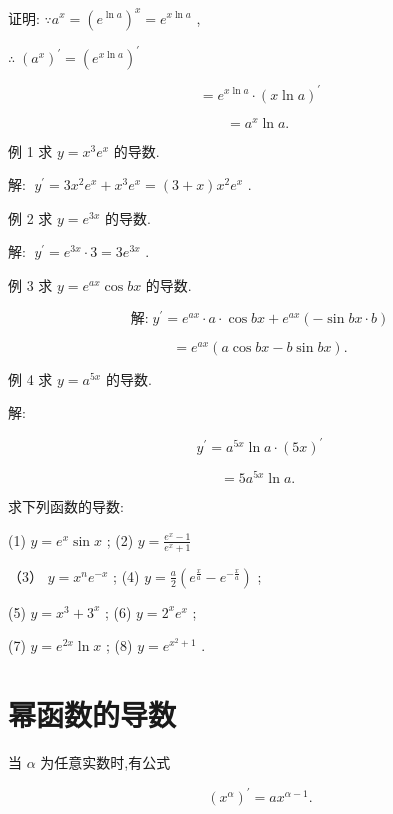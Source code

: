 \documentclass[lang=cn,newtx,10pt,scheme=chinese]{elegantbook}
\begin{document}
证明: \(\because {a}^{x} = {\left( {e}^{\ln a}\right) }^{x} = {e}^{x\ln a}\) ,

\(\therefore \;{\left( {a}^{x}\right) }^{\prime } = {\left( {e}^{x\ln a}\right) }^{\prime }\)

\[
= {e}^{x\ln a} \cdot {\left( x\ln a\right) }^{\prime }
\]

\[
= {a}^{x}\ln a\text{. }
\]

例 1 求 \(y = {x}^{3}{e}^{x}\) 的导数.

解: \(\;{y}^{\prime } = 3{x}^{2}{e}^{x} + {x}^{3}{e}^{x} = \left( {3 + x}\right) {x}^{2}{e}^{x}\) .

例 2 求 \(y = {e}^{3x}\) 的导数.

解: \(\;{y}^{\prime } = {e}^{3x} \cdot 3 = 3{e}^{3x}\) .

例 3 求 \(y = {e}^{ax}\cos {bx}\) 的导数.

\[
\text{解:}\;{y}^{\prime } = {e}^{ax} \cdot a \cdot \cos {bx} + {e}^{ax}\left( {-\sin {bx} \cdot b}\right)
\]

\[
= {e}^{ax}\left( {a\cos {bx} - b\sin {bx}}\right) \text{.}
\]

例 4 求 \(y = {a}^{5x}\) 的导数.

解:

\[
{y}^{\prime } = {a}^{5x}\ln a \cdot {\left( 5x\right) }^{\prime }
\]

\[
= 5{a}^{5x}\ln a\text{. }
\]

\begin{problemset}[练习]

\item 求下列函数的导数:

(1) \(y = {e}^{x}\sin x\) ; (2) \(y = \frac{{e}^{x} - 1}{{e}^{x} + 1}\)

（3） \(y = {x}^{n}{e}^{-x}\) ; (4) \(y = \frac{a}{2}\left( {{e}^{\frac{x}{a}} - {e}^{-\frac{x}{a}}}\right)\) ;

(5) \(y = {x}^{3} + {3}^{x}\) ; (6) \(y = {2}^{x}{e}^{x}\) ;

(7) \(y = {e}^{2x}\ln x\) ; (8) \(y = {e}^{{x}^{2} + 1}\) .

\end{problemset}

\section{幂函数的导数}

当 \(\alpha\) 为任意实数时,有公式

\[
{\left( {x}^{\alpha }\right) }^{\prime } = a{x}^{\alpha - 1}.
\]
\end{document}
